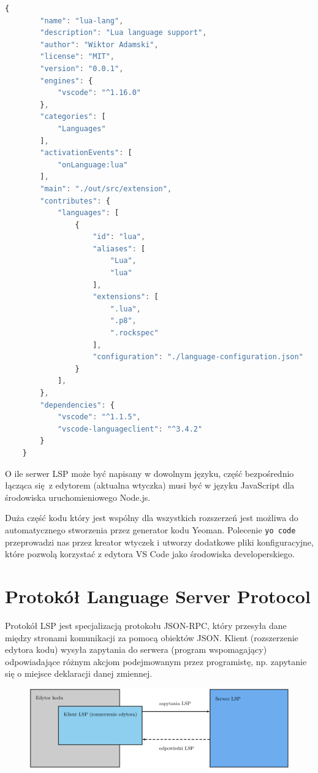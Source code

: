 \begin{lstlisting}[language=JavaScript, basicstyle=\fontsize{9}{10}\ttfamily]
    {
        "name": "lua-lang",
        "description": "Lua language support",
        "author": "Wiktor Adamski",
        "license": "MIT",
        "version": "0.0.1",
        "engines": {
            "vscode": "^1.16.0"
        },
        "categories": [
            "Languages"
        ],
        "activationEvents": [
            "onLanguage:lua"
        ],
        "main": "./out/src/extension",
        "contributes": {
            "languages": [
                {
                    "id": "lua",
                    "aliases": [
                        "Lua",
                        "lua"
                    ],
                    "extensions": [
                        ".lua",
                        ".p8",
                        ".rockspec"
                    ],
                    "configuration": "./language-configuration.json"
                }
            ],
        },
        "dependencies": {
            "vscode": "^1.1.5",
            "vscode-languageclient": "^3.4.2"
        }
    }
\end{lstlisting}

O ile serwer LSP może być napisany w dowolnym języku, część bezpośrednio łącząca się z edytorem (aktualna wtyczka) musi być w języku JavaScript dla środowiska uruchomieniowego Node.js. 

Duża część kodu który jest wspólny dla wszystkich rozszerzeń jest możliwa do automatycznego stworzenia przez generator kodu Yeoman. Polecenie \texttt{yo code} przeprowadzi nas przez kreator wtyczek i utworzy dodatkowe pliki konfiguracyjne, które pozwolą korzystać z edytora VS Code jako środowiska developerskiego.

\section{Protokół Language Server Protocol}
Protokół LSP \cite{docs} jest specjalizacją protokołu JSON-RPC, który przesyła dane między stronami komunikacji za pomocą obiektów JSON. Klient (rozszerzenie edytora kodu) wysyła zapytania do serwera (program wspomagający) odpowiadające różnym akcjom podejmowanym przez programistę, np. zapytanie się o miejsce deklaracji danej zmiennej.

\begin{figure}[H]
    \centering
    \includegraphics[scale=0.4]{Chapters/graf_komunikacji}
\end{figure}

